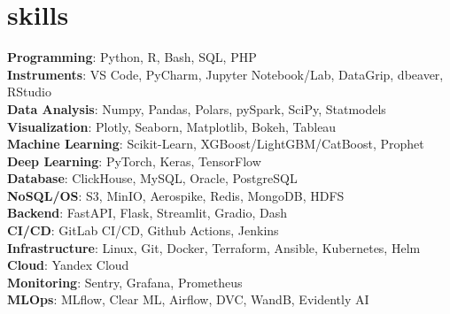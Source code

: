 \section{skills}
\begin{itemize}[leftmargin=0.15in, label={}]
  {\item{
        \textbf{Programming}{: Python, R, Bash, SQL, PHP} \\
        \textbf{Instruments}{: VS Code, PyCharm, Jupyter Notebook/Lab, DataGrip, dbeaver, RStudio} \\
        \textbf{Data Analysis}{: Numpy, Pandas, Polars, pySpark, SciPy, Statmodels} \\
        \textbf{Visualization}{: Plotly, Seaborn, Matplotlib, Bokeh, Tableau} \\
        \textbf{Machine Learning}{: Scikit-Learn, XGBoost/LightGBM/CatBoost, Prophet} \\
        \textbf{Deep Learning}{: PyTorch, Keras, TensorFlow} \\
        \textbf{Database}{: ClickHouse, MySQL, Oracle, PostgreSQL} \\
        \textbf{NoSQL/OS}{: S3, MinIO, Aerospike, Redis, MongoDB, HDFS} \\
        \textbf{Backend}{: FastAPI, Flask, Streamlit, Gradio, Dash} \\
        \textbf{CI/CD}{: GitLab CI/CD, Github Actions, Jenkins} \\
        \textbf{Infrastructure}{: Linux, Git, Docker, Terraform, Ansible, Kubernetes, Helm} \\
        \textbf{Cloud}{: Yandex Cloud} \\
        \textbf{Monitoring}{: Sentry, Grafana, Prometheus} \\
        \textbf{MLOps}{: MLflow, Clear ML, Airflow, DVC, WandB, Evidently AI} \\
        }}
\end{itemize}